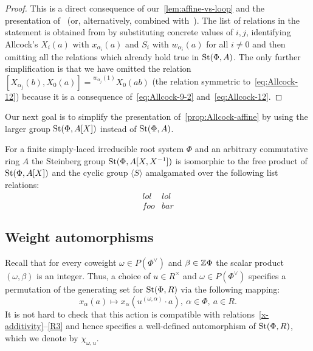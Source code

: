 \begin{proof}
    This is a direct consequence of our~\cref{lem:affine-vs-loop} and the presentation of~\cite[Theorem~1]{A16} (or, alternatively, \cite[Theorem~1.1]{A13} combined with~\cite[Theorem~1.3]{A13}).
    The list of relations in the statement is obtained from \cite[Table~1]{A16} by substituting concrete values of $i, j$, identifying Allcock's $X_{i}(a)$ with  $x_{\alpha_i}(a)$ and $S_i$ with $w_{\alpha_i}(a)$ for all $i\neq 0$ and then omitting all the relations which already hold true in $\operatorname{St}(\Phi, A)$.
    The only further simplification is that we have omitted the relation $[X_{\alpha_j}(b), X_0(a)] = {}^{w_{\alpha_j}(1)} X_0(ab)$ (the relation symmetric to~\eqref{eq:Allcock-12})
    because it is a consequence of~\eqref{eq:Allcock-9-2} and~\eqref{eq:Allcock-12}.
\end{proof}

Our next goal is to simplify the presentation of~\cref{prop:Allcock-affine} by using the larger group $\operatorname{St}(\Phi, A[X])$ instead of $\operatorname{St}(\Phi, A)$.
\begin{prop}
    For a finite simply-laced irreducible root system $\Phi$ and an arbitrary commutative ring $A$ the Steinberg group $\operatorname{St}(\Phi, A[X, X^{-1}])$ is isomorphic
    to the free product of $\operatorname{St}(\Phi, A[X])$ and the cyclic group $\langle S \rangle$ amalgamated over the following list relations:
    \begin{align}
        lol & lol \\
        foo & bar
    \end{align}
\end{prop}

\subsection{Weight automorphisms}\label{subsec:weight-automorphisms}
Recall that for every coweight $\omega \in P(\Phi^\vee)$ and $\beta \in \mathbb{Z} \Phi$ the scalar product $(\omega, \beta)$ is an integer.
Thus, a choice of $u \in R^\times$ and $\omega \in P(\Phi^\vee)$ specifies a permutation of the generating set for $\operatorname{St}(\Phi, R)$ via the following mapping:
\begin{equation*} x_\alpha(a) \mapsto x_\alpha(u^{(\omega, \alpha)} \cdot a),\ \alpha\in \Phi,\ a \in R. \end{equation*}
It is not hard to check that this action is compatible with relations~\eqref{x-additivity}--\eqref{R3} and hence specifies a well-defined automorphism of $\operatorname{St}(\Phi, R)$, which we denote by $\chi_{\omega, u}$.

